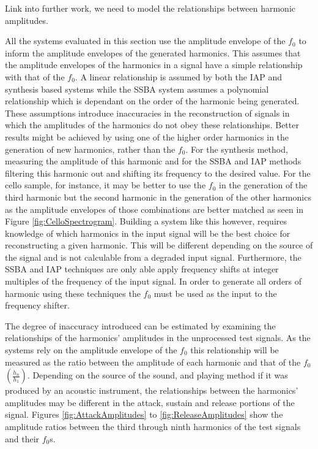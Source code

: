 		\note
		{
			Link into further work, we need to model the relationships between harmonic amplitudes.
		}

		All the systems evaluated in this section use the amplitude envelope of the $f_{0}$ to inform the amplitude
		envelopes of the generated harmonics. This assumes that the amplitude envelopes of the harmonics in a
		signal have a simple relationship with that of the $f_{0}$. A linear relationship is assumed by both the
		IAP and synthesis based systems while the SSBA system assumes a polynomial relationship which is dependant
		on the order of the harmonic being generated. These assumptions introduce inaccuracies in the
		reconstruction of signals in which the amplitudes of the harmonics do not obey these relationships. Better
		results might be achieved by using one of the higher order harmonics in the generation of new harmonics,
		rather than the $f_{0}$. For the synthesis method, measuring the amplitude of this harmonic and for the
		SSBA and IAP methods filtering this harmonic out and shifting its frequency to the desired value. For the
		cello sample, for instance, it may be better to use the $f_{0}$ in the generation of the third harmonic but
		the second harmonic in the generation of the other harmonics as the amplitude envelopes of those
		combinations are better matched as seen in Figure \ref{fig:CelloSpectrogram}. Building a system like this
		however, requires knowledge of which harmonics in the input signal will be the best choice for
		reconstructing a given harmonic. This will be different depending on the source of the signal and is not
		calculable from a degraded input signal. Furthermore, the SSBA and IAP techniques are only able apply
		frequency shifts at integer multiples of the frequency of the input signal. In order to generate all orders
		of harmonic using these techniques the $f_{0}$ must be used as the input to the frequency shifter.
		
		The degree of inaccuracy introduced can be estimated by examining the relationships of the harmonics'
		amplitudes in the unprocessed test signals. As the systems rely on the amplitude envelope of the $f_{0}$
		this relationship will be measured as the ratio between the amplitude of each harmonic and that of the
		$f_{0}$ $\left(\frac{h_{n}}{h_{1}}\right)$. Depending on the source of the sound, and playing method if
		it was produced by an acoustic instrument, the relationships between the harmonics' amplitudes may be
		different in the attack, sustain and release portions of the signal. Figures \ref{fig:AttackAmplitudes} to
		\ref{fig:ReleaseAmplitudes} show the amplitude ratios between the third through ninth harmonics of the test
		signals and their $f_{0}$s.

